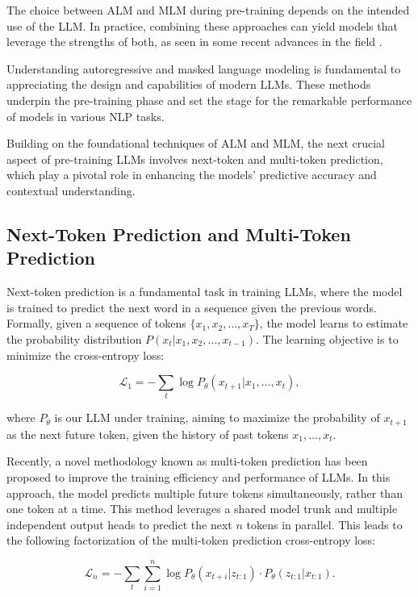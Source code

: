 The choice between ALM and MLM during pre-training depends on the intended use of the LLM. In practice, combining these approaches can yield models that leverage the strengths of both, as seen in some recent advances in the field \cite{lewis2019bart}.

Understanding autoregressive and masked language modeling is fundamental to appreciating the design and capabilities of modern LLMs. These methods underpin the pre-training phase and set the stage for the remarkable performance of models in various NLP tasks.

Building on the foundational techniques of ALM and MLM, the next crucial aspect of pre-training LLMs involves next-token and multi-token prediction, which play a pivotal role in enhancing the models’ predictive accuracy and contextual understanding.

\subsection{Next-Token Prediction and Multi-Token Prediction}

Next-token prediction is a fundamental task in training LLMs, where the model is trained to predict the next word in a sequence given the previous words. Formally, given a sequence of tokens \( \{x_1, x_2, \ldots, x_T\} \), the model learns to estimate the probability distribution \( P(x_t | x_1, x_2, \ldots, x_{t-1}) \). The learning objective is to minimize the cross-entropy loss:

\begin{equation}
    \mathcal{L}_1 = - \sum_{t} \log P_\theta (x_{t+1} | x_1, \ldots, x_t),
\end{equation}

where \( P_\theta \) is our LLM under training, aiming to maximize the probability of \( {x_{t+1}} \) as the next future token, given the history of past tokens \( {x_1, \ldots, x_t} \).

Recently, a novel methodology known as multi-token prediction has been proposed to improve the training efficiency and performance of LLMs. In this approach, the model predicts multiple future tokens simultaneously, rather than one token at a time. This method leverages a shared model trunk and multiple independent output heads to predict the next \( n \) tokens in parallel. This leads to the following factorization of the multi-token prediction cross-entropy
loss:

\begin{equation}
    \mathcal{L}_n = - \sum_{t} \sum_{i=1}^{n} \log P_\theta (x_{t+i} | z_{t:1}) \cdot P_\theta(z_{t:1} | x_{t:1}).
\end{equation}

